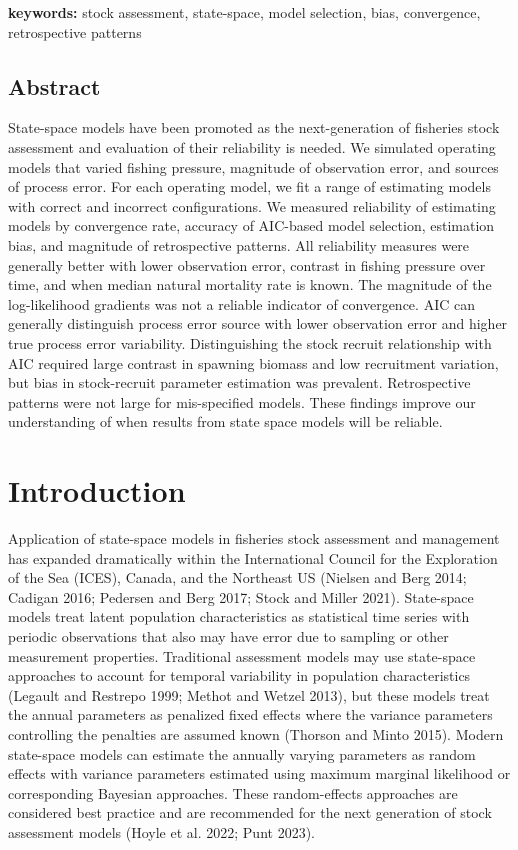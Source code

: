 \documentclass[
  12pt,
]{article}
\begin{document}
\pagebreak

\textbf{keywords:} stock assessment, state-space, model selection, bias,
convergence, retrospective patterns

\subsection*{Abstract}\label{abstract}

State-space models have been promoted as the next-generation of
fisheries stock assessment and evaluation of their reliability is
needed. We simulated operating models that varied fishing pressure,
magnitude of observation error, and sources of process error. For each
operating model, we fit a range of estimating models with correct and
incorrect configurations. We measured reliability of estimating models
by convergence rate, accuracy of AIC-based model selection, estimation
bias, and magnitude of retrospective patterns. All reliability measures
were generally better with lower observation error, contrast in fishing
pressure over time, and when median natural mortality rate is known. The
magnitude of the log-likelihood gradients was not a reliable indicator
of convergence. AIC can generally distinguish process error source with
lower observation error and higher true process error variability.
Distinguishing the stock recruit relationship with AIC required large
contrast in spawning biomass and low recruitment variation, but bias in
stock-recruit parameter estimation was prevalent. Retrospective patterns
were not large for mis-specified models. These findings improve our
understanding of when results from state space models will be reliable.

\pagebreak

\section*{Introduction}\label{introduction}

Application of state-space models in fisheries stock assessment and
management has expanded dramatically within the International Council
for the Exploration of the Sea (ICES), Canada, and the Northeast US
(Nielsen and Berg 2014; Cadigan 2016; Pedersen and Berg 2017; Stock and
Miller 2021). State-space models treat latent population characteristics
as statistical time series with periodic observations that also may have
error due to sampling or other measurement properties. Traditional
assessment models may use state-space approaches to account for temporal
variability in population characteristics (Legault and Restrepo 1999;
Methot and Wetzel 2013), but these models treat the annual parameters as
penalized fixed effects where the variance parameters controlling the
penalties are assumed known (Thorson and Minto 2015). Modern state-space
models can estimate the annually varying parameters as random effects
with variance parameters estimated using maximum marginal likelihood or
corresponding Bayesian approaches. These random-effects approaches are
considered best practice and are recommended for the next generation of
stock assessment models (Hoyle et al. 2022; Punt 2023).
\end{document}
